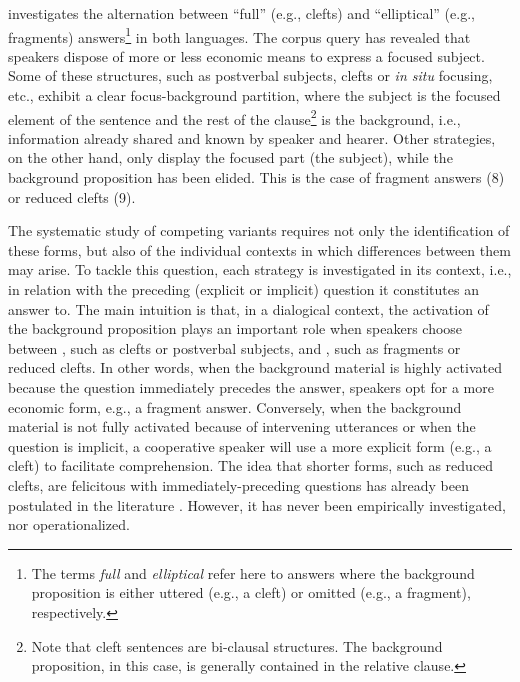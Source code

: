 \textsc{} investigates the alternation between ``full” (e.g., clefts) and ``elliptical” (e.g., fragments) answers\footnote{The terms \textit{full} and \textit{elliptical} refer here to answers where the background proposition is either uttered (e.g., a cleft) or omitted (e.g., a fragment), respectively.} in both languages.
The corpus query has revealed that speakers dispose of more or less economic means to express a focused subject. Some of these structures, such as postverbal subjects, clefts or \textit{in situ} focusing, etc., exhibit a clear focus-background partition, where the subject is the focused element of the sentence and the rest of the clause\footnote{Note that cleft sentences are bi-clausal structures. The background proposition, in this case, is generally contained in the relative clause.} is the background, i.e., information already shared and known by speaker and hearer. Other strategies, on the other hand, only display the focused part (the subject), while the background proposition has been elided. This is the case of fragment answers (8) or reduced clefts (9). 

The systematic study of competing variants requires not only the identification of these forms, but also of the individual contexts in which differences between them may arise. To tackle this question, each strategy is investigated in its context, i.e., in relation with the preceding (explicit or implicit) question it constitutes an answer to. The main intuition is that, in a dialogical context, the activation of the background proposition plays an important role when speakers choose between , such as clefts or postverbal subjects, and , such as fragments or reduced clefts. In other words, when the background material is highly activated because the question immediately precedes the answer, speakers opt for a more economic form, e.g., a fragment answer. Conversely, when the background material is not fully activated because of intervening utterances or when the question is implicit, a cooperative speaker will use a more explicit form (e.g., a cleft) to facilitate comprehension. The idea that shorter forms, such as reduced clefts, are felicitous with immediately-preceding questions has already been postulated in the literature \parencite{belletti2008answering, katz2000categories}. However, it has never been empirically investigated, nor operationalized. 

